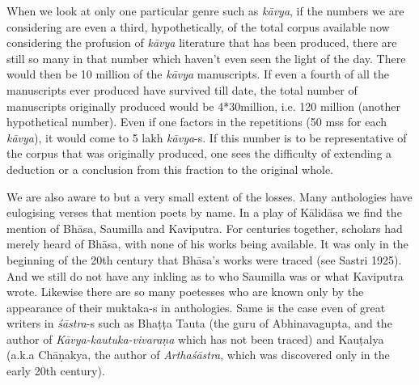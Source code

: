 When we look at only one particular genre such as {\sl kāvya}, if the numbers we are considering are even a third, hypothetically, of the total corpus available now considering the profusion of {\sl kāvya} literature that has been produced, there are still so many in that number which haven’t even seen the light of the day. There would then be 10 million of the {\sl kāvya} manuscripts. If even a fourth of all the manuscripts ever produced have survived till date, the total number of manuscripts originally produced would be 4*30million, i.e. 120 million (another hypothetical number). Even if one factors in the repetitions (50 mss for each {\sl kāvya}), it would come to 5 lakh {\sl kāvya}-s. If this number is to be representative of the corpus that was originally produced, one sees the difficulty of extending a deduction or a conclusion from this fraction to the original whole.

We are also aware to but a very small extent of the losses. Many anthologies have eulogising verses that mention poets by name. In a play of Kālidāsa we find the mention of Bhāsa, Saumilla and Kaviputra. For centuries together, scholars had merely heard of Bhāsa, with none of his works being available. It was only in the beginning of the 20th century that Bhāsa’s works were traced (see Sastri 1925). And we still do not have any inkling as to who Saumilla was or what Kaviputra wrote. Likewise there are so many poetesses who are known only by the appearance of their muktaka-s in anthologies. Same is the case even of great writers in {\sl śāstra}-s such as Bhaṭṭa Tauta (the guru of Abhinavagupta, and the author of {\sl Kāvya-kautuka-vivaraṇa} which has not been traced) and Kauṭalya (a.k.a Chāṇakya, the author of {\sl Arthaśāstra}, which was discovered only in the early 20th century). 

